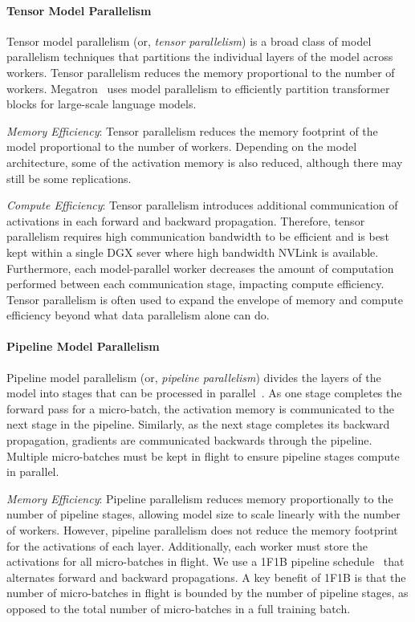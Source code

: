 \documentclass[11pt]{article}
\begin{document}
\paragraph{Tensor Model Parallelism}
Tensor model parallelism (or, \emph{tensor parallelism})
is a broad class of model parallelism techniques that partitions the
individual layers of the model across workers. Tensor parallelism reduces the
memory proportional to the number of workers. Megatron~\cite{megatron-DBLP:journals/corr/abs-1909-08053} uses model parallelism
to efficiently partition transformer blocks for large-scale language models.


\textit{Memory Efficiency}: Tensor parallelism reduces the memory footprint of
the model proportional to the number of workers. Depending on the model
architecture, some of the activation memory is also reduced, although there may
still be some replications.

\textit{Compute Efficiency}: Tensor parallelism introduces additional communication of activations in each forward and backward
propagation. Therefore, tensor parallelism requires high communication bandwidth to be
efficient and is best kept within a single DGX sever where high bandwidth NVLink is available. Furthermore, each model-parallel worker decreases the
amount of computation performed between each communication stage, impacting
compute efficiency. Tensor parallelism is often used to expand the envelope of memory and compute efficiency beyond what data parallelism alone can do.

\paragraph{Pipeline Model Parallelism}
Pipeline model parallelism (or, \emph{pipeline parallelism}) divides the layers of the model into stages that
can be processed in parallel~\cite{huang2019gpipe,narayanan2019pipedream}.
As one
stage completes the forward pass for a
micro-batch, the activation memory is communicated to the next stage in the
pipeline. Similarly, as the next stage completes its backward propagation,
gradients are communicated backwards through the pipeline. Multiple
micro-batches must be kept in flight to ensure pipeline stages compute in
parallel.

\textit{Memory Efficiency}: Pipeline parallelism reduces memory proportionally to
the number of pipeline stages, allowing model size to scale linearly with the
number of workers. However, pipeline parallelism does not reduce the memory
footprint for the activations of each layer. Additionally, each worker must
store the activations for all micro-batches in flight. We use a 1F1B pipeline
schedule~\cite{narayanan2019pipedream} that alternates forward and backward
propagations. A key benefit of 1F1B is that the number of micro-batches in flight
is bounded by the number of pipeline stages, as opposed to the total number of micro-batches
in a full training batch. 
\end{document}
